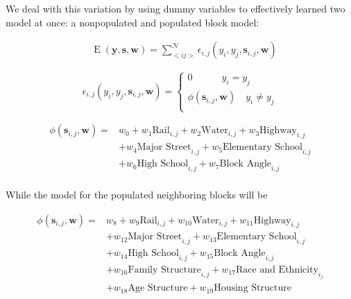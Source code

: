 \documentclass[12pt,letter]{article}\usepackage[]{graphicx}\usepackage[]{color}
\begin{document}
We deal with this variation by using dummy variables to effectively
learned two model at once: a nonpopulated and populated block model:

\begin{align}
&\operatorname{E}(\mathbf{y}, \mathbf{s}, \mathbf{w}) = \sum_{<i
    j>}^{\mathcal{N}}\epsilon_{i,j}(y_i, y_j, \mathbf{s}_{i,j}, \mathbf{w})  
\end{align}

\begin{equation}
\epsilon_{i,j}(y_i, y_j, \mathbf{s}_{i,j}, \mathbf{w}) = \begin{cases}
    0 \quad\quad\quad y_i = y_j \\
    \phi(\mathbf{s}_{i,j}, \mathbf{w}) \quad y_i \neq y_j \\
  \end{cases}
\end{equation}

\begin{align}
\phi(\mathbf{s}_{i,j}, \mathbf{w}) = & w_0 
                                     + w_1\text{Rail}_{i,j} 
                                     + w_2\text{Water}_{i,j} 
                                     + w_3\text{Highway}_{i,j} \\
                                     &+ w_4\text{Major Street}_{i,j} 
                                     + w_5\text{Elementary School}_{i,j}\\ 
                                     & + w_6\text{High School}_{i,j}
                                     + w_7\text{Block Angle}_{i,j} \\
\end{align}

While the model for the populated neighboring blocks will be

\begin{align}
\phi(\mathbf{s}_{i,j}, \mathbf{w}) = & w_8 
                                     + w_9\text{Rail}_{i,j} 
                                     + w_{10}\text{Water}_{i,j} 
                                     + w_{11}\text{Highway}_{i,j}\\
                                     &+ w_{12}\text{Major Street}_{i,j} 
                                     + w_{13}\text{Elementary School}_{i,j}\\
                                     &+ w_{14}\text{High School}_{i,j} 
                                     + w_{15}\text{Block Angle}_{i,j}\\
                                     &+ w_{16}\text{Family Structure}_{i,j}
                                     + w_{17}\text{Race and Ethnicity}_{i_j}\\
                                     &+ w_{18}\text{Age Structure}  
                                     + w_{19}\text{Housing Structure}
\end{align}
\end{document}
